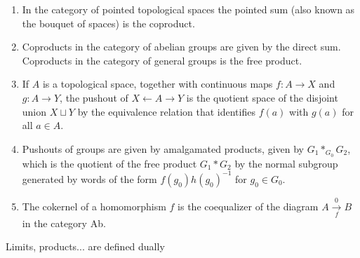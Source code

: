 \begin{example}[Colimits]
\begin{enumerate}
        \item In the category of pointed topological spaces the pointed sum (also known as the bouquet of spaces) is the coproduct.
        \item Coproducts in the category of abelian groups are given by the direct sum. Coproducts in the category of general groups is the free product.
        \item If $A$ is a topological space, together with continuous maps $f: A \rightarrow X$ and $g: A \rightarrow Y$, the pushout of $X \leftarrow A \rightarrow Y$ is the quotient space of the disjoint union $X \sqcup Y$ by the equivalence relation that identifies $f(a)$ with $g(a)$ for all $a \in A$.
        \item Pushouts of groups are given by amalgamated products, given by $G_1 *_{G_0} G_2$, which is the quotient of the free product $G_1 * G_2$ by the normal subgroup generated by words of the form $f\left(g_0\right) h\left(g_0\right)^{-1}$ for $g_0 \in G_0$.
        \item The cokernel of a homomorphism $f$ is the coequalizer of the diagram $A \underset{f}{\stackrel{0 }{\longrightarrow}} B$ in the category Ab.
    \end{enumerate}
\end{example}

Limits, products... are defined dually

